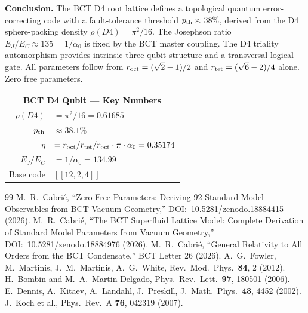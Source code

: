 \documentclass[aps,prl,twocolumn,superscriptaddress,floatfix]{revtex4-2}
\begin{document}
\medskip
\noindent\textbf{Conclusion.}
The BCT D4 root lattice defines a topological quantum error-correcting code
with a fault-tolerance threshold $p_{\rm th} \approx 38\%$, derived from
the D4 sphere-packing density $\rho(D4) = \pi^2/16$.
The Josephson ratio $E_J/E_C \approx 135 = 1/\alpha_0$ is fixed by the
BCT master coupling. The D4 triality automorphism provides intrinsic
three-qubit structure and a transversal logical gate.
All parameters follow from $r_{\rm oct} = (\sqrt{2}-1)/2$ and
$r_{\rm tet} = (\sqrt{6}-2)/4$ alone. Zero free parameters.

\bigskip
\begin{center}
\begin{small}
\begin{tabular}{rl}
\multicolumn{2}{c}{\textbf{BCT D4 Qubit — Key Numbers}} \\[2pt]
$\rho(D4)$ & $= \pi^2/16 = 0.61685$ \\
$p_{\rm th}$ & $\approx 38.1\%$ \\
$\eta$ & $= r_{\rm oct}/r_{\rm tet}/r_{\rm oct}\cdot\pi \cdot \alpha_0 = 0.35174$ \\
$E_J/E_C$ & $= 1/\alpha_0 = 134.99$ \\
Base code & $[[12,2,4]]$ \\
\end{tabular}
\end{small}
\end{center}

\begin{thebibliography}{99}
 M.~R.~Cabri\'e,
  ``Zero Free Parameters: Deriving 92 Standard Model Observables
  from BCT Vacuum Geometry,''
  DOI:~10.5281/zenodo.18884415 (2026).
 M.~R.~Cabri\'e,
  ``The BCT Superfluid Lattice Model: Complete Derivation of Standard Model
  Parameters from Vacuum Geometry,''
  DOI:~10.5281/zenodo.18884976 (2026).
 M.~R.~Cabri\'e,
  ``General Relativity to All Orders from the BCT Condensate,''
  BCT Letter 26 (2026).
 A.~G.~Fowler, M.~Martinis, J.~M.~Martinis, A.~G.~White,
  Rev.\ Mod.\ Phys.\ \textbf{84}, 2 (2012).
 H.~Bombin and M.~A.~Martin-Delgado,
  Phys.\ Rev.\ Lett.\ \textbf{97}, 180501 (2006).
 E.~Dennis, A.~Kitaev, A.~Landahl, J.~Preskill,
  J.\ Math.\ Phys.\ \textbf{43}, 4452 (2002).
 J.~Koch et al.,
  Phys.\ Rev.\ A \textbf{76}, 042319 (2007).
\end{thebibliography}
\end{document}
